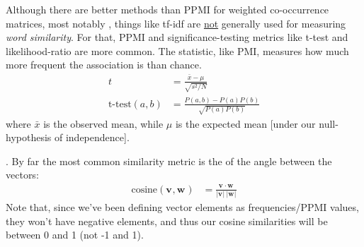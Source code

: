 \documentclass[11pt]{article}
\renewcommand\vec[2][]{\bm{#2}_{#1}}
\newcommand\myspace[1][]{\vspace{#1\bigskipamount}}
\newcommand\p{\Needspace{10\baselineskip} \noindent}
\begin{document}
\p Although there are better methods than PPMI for weighted co-occurrence matrices, most notably , things like tf-idf are \underline{not} generally used for measuring \textit{word similarity}. For that, PPMI and significance-testing metrics like t-test and likelihood-ratio are more common. The  statistic, like PMI, measures how much more frequent the association is than chance.
\begin{align}
t &= \frac{\bar x - \mu}{ \sqrt{ s^2 / N } }\\
\text{t-test}(a, b) &= \frac{ P(a, b) - P(a) P(b) }{  \sqrt{  P(a) P(b)   }   }
\end{align}
where $\bar x$ is the observed mean, while $\mu$ is the expected mean [under our null-hypothesis of independence]. 

\myspace 
\p {}. By far the most common similarity metric is the  of the angle between the vectors:
\begin{align}
\text{cosine}(\vec{v}, \vec{w}) &= \frac{ \vec{v} \cdot \vec{w} }{
	| \vec{v} |~| \vec{w} |
	}
\end{align}
Note that, since we've been defining vector elements as frequencies/PPMI values, they won't have negative elements, and thus our cosine similarities will be between 0 and 1 (not -1 and 1).\\
\end{document}
